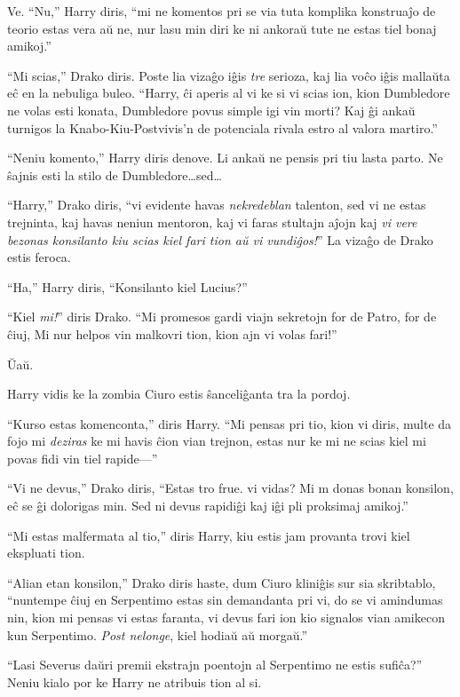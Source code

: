 Ve. ``Nu,'' Harry diris, ``mi ne komentos pri se via tuta komplika
konstruaĵo de teorio estas vera aŭ ne, nur lasu min diri ke ni ankoraŭ
tute ne estas tiel bonaj amikoj.''

``Mi scias,'' Drako diris. Poste lia vizaĝo iĝis \emph{tre} serioza,
kaj lia voĉo iĝis mallaŭta eĉ en la nebuliga buleo. ``Harry, ĉi aperis
al vi ke si vi scias ion, kion Dumbledore ne volas esti konata,
Dumbledore povus simple igi vin morti? Kaj ĝi ankaŭ turnigos la
Knabo-Kiu-Postvivis'n de potenciala rivala estro al valora martiro.''

``Neniu komento,'' Harry diris denove. Li ankaŭ ne pensis pri tiu
lasta parto. Ne ŝajnis esti la stilo de Dumbledore\ldots sed\ldots

``Harry,'' Drako diris, ``vi evidente havas \emph{nekredeblan}
talenton, sed vi ne estas trejninta, kaj havas neniun mentoron, kaj vi
faras stultajn aĵojn kaj \emph{vi vere bezonas konsilanto kiu scias
kiel fari tion aŭ vi vundiĝos!}'' La vizaĝo de Drako estis
feroca.

``Ha,'' Harry diris, ``Konsilanto kiel Lucius?''

``Kiel \emph{mi!}'' diris Drako. ``Mi promesos gardi viajn sekretojn
for de Patro, for de ĉiuj, Mi nur helpos vin malkovri tion, kion ajn
vi volas fari!''

Ŭaŭ.


Harry vidis ke la zombia Ciuro estis ŝanceliĝanta tra la pordoj.

``Kurso estas komenconta,'' diris Harry. ``Mi pensas pri tio, kion vi
diris, multe da fojo mi \emph{deziras} ke mi havis ĉion vian trejnon,
estas nur ke mi ne scias kiel mi povas fidi vin tiel rapide—''

``Vi ne devus,'' Drako diris, ``Estas tro frue. vi vidas? Mi m donas
bonan konsilon, eĉ se ĝi dolorigas min. Sed ni devus rapidiĝi kaj iĝi
pli proksimaj amikoj.''

``Mi estas malfermata al tio,'' diris Harry, kiu estis jam provanta
trovi kiel ekspluati tion.

``Alian etan konsilon,'' Drako diris haste, dum Ciuro kliniĝis sur sia
skribtablo, ``nuntempe ĉiuj en Serpentimo estas sin demandanta pri vi,
do se vi amindumas nin, kion mi pensas vi estas faranta, vi devus fari
ion kio signalos vian amikecon kun Serpentimo. \emph{Post nelonge},
kiel hodiaŭ aŭ morgaŭ.''

``Lasi Severus daŭri premii ekstrajn poentojn al Serpentimo ne estis
sufiĉa?'' Neniu kialo por ke Harry ne atribuis tion al si.

